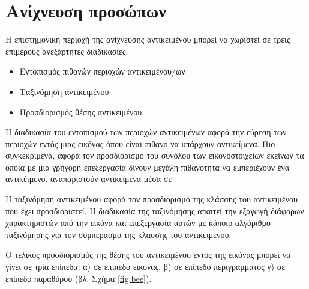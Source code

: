 \chapter{Ανίχνευση προσώπων}\label{ch:facedetection}
Η επιστημονική περιοχή της ανίχνευσης αντικειμένου μπορεί να χωριστεί
σε τρεις επιμέρους ανεξάρτητες διαδικασίες.
\begin{itemize}
    \item Εντοπισμός πιθανών περιοχών αντικειμένου/ων
    \item Ταξινόμηση αντικειμένου
    \item Προσδιορισμός θέσης αντικειμένου
\end{itemize}


H διαδικασία του εντοπισμού των περιοχών αντικειμένων αφορά την εύρεση των περιοχών
εντός μιας εικόνας όπου είναι πιθανό να υπάρχουν αντικείμενα. Πιο συγκεκριμένα, αφορά τον προσδιορισμό
του συνόλου των εικονοστοιχείων εκείνων τα οποία με μια γρήγορη επεξεργασία δίνουν
μεγάλη πιθανότητα να εμπεριέχουν ένα αντικέιμενο. αναπαριστούν αντικείμενα μέσα σε

Η ταξινόμηση αντικειμένου αφορά τον προσδιορισμό της κλάσσης του αντικειμένου που
έχει προσδιοριστεί. Η διαδικασία της ταξινόμησης απαιτεί την εξαγωγή διάφορων
χαρακτηριστών από την εικόνα και επεξεργασία αυτών με κάποιο αλγόριθμο ταξινόμησης
για τον συμπερασμο της κλασσης του αντικειμενου.

Ο τελικός προσδιορισμός της θέσης του αντικειμένου εντός της εικόνας μπορεί να γίνει σε
τρία επίπεδα: α) σε επίπεδο εικόνας, β) σε επίπεδο περιγράμματος γ) σε επίπεδο παραθύρου
(βλ. Σχήμα \ref{fig:bee}).

